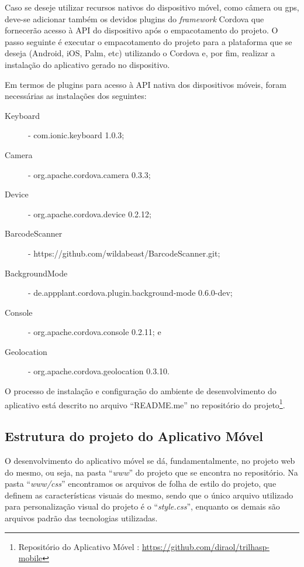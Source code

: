 Caso se deseje utilizar recursos nativos do dispositivo móvel, como câmera ou gps, deve-se adicionar também os devidos plugins do \textit{framework} Cordova que fornecerão acesso à API do dispositivo após o empacotamento do projeto. O passo seguinte é executar o empacotamento do projeto para a plataforma que se deseja (Android, iOS, Palm, etc) utilizando o Cordova e, por fim, realizar a instalação do aplicativo gerado no dispositivo.


Em termos de plugins para acesso à API nativa dos dispositivos móveis, foram necessárias as instalações dos seguintes:
\begin{description}
    \item[Keyboard] - com.ionic.keyboard 1.0.3;
    \item[Camera] - org.apache.cordova.camera 0.3.3;
    \item[Device] - org.apache.cordova.device 0.2.12;
    \item[BarcodeScanner] - https://github.com/wildabeast/BarcodeScanner.git;
    \item[BackgroundMode] - de.appplant.cordova.plugin.background-mode 0.6.0-dev;
    \item[Console] - org.apache.cordova.console 0.2.11; e
    \item[Geolocation] - org.apache.cordova.geolocation 0.3.10.
\end{description}

O processo de instalação e configuração do ambiente de desenvolvimento do aplicativo está descrito no arquivo ``README.me'' no repositório do projeto\footnote{Repositório do Aplicativo Móvel \trilhasp: \url{https://github.com/diraol/trilhasp-mobile}}.

\subsection{Estrutura do projeto do Aplicativo Móvel}
O desenvolvimento do aplicativo móvel se dá, fundamentalmente, no projeto web do mesmo, ou seja, na pasta ``\textit{www}'' do projeto que se encontra no repositório. Na pasta ``\textit{www/css}'' encontramos os arquivos de folha de estilo do projeto, que definem as características visuais do mesmo, sendo que o único arquivo utilizado para personalização visual do projeto é o ``\textit{style.css}'', enquanto os demais são arquivos padrão das tecnologias utilizadas.

